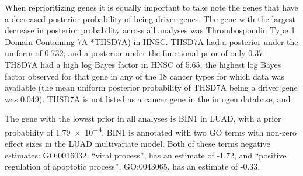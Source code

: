 When reprioritizing genes it is equally important to take note the genes that have a decreased posterior probability of being driver genes.  The gene with the largest decrease in posterior probability across all analyses was Thrombospondin Type 1 Domain Containing 7A *THSD7A)  in HNSC.  THSD7A had a posterior under the uniform of 0.732, and a posterior under the functional prior of only 0.37.    THSD7A had a high log Bayes factor in HNSC of 5.65,  the highest log Bayes factor observed for that gene in any of the 18 cancer types for which data was available (the mean uniform posterior probability of THSD7A being a driver gene was 0.049).  THSD7A is not listed as a cancer gene in the intogen database, and 


The gene with the lowest prior in all analyses is BIN1 in LUAD, with a prior probability of \num{1.79e-4}.  BIN1 is annotated with two GO terms with non-zero effect sizes in the LUAD multivariate model.  Both of these terms negative estimates: GO:0016032, ``viral process'', has an estimate of -1.72, and ``positive regulation of apoptotic process'', GO:0043065, has an estimate of -0.33.






